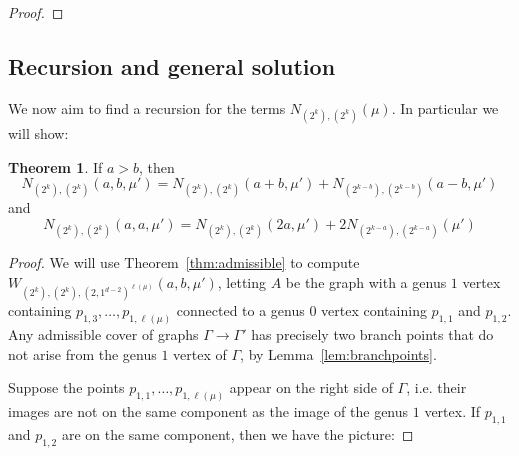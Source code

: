 \documentclass[11pt]{article}           %
\theoremstyle{definition}
\newtheorem{thm}{Theorem}[section]
\begin{document}
\begin{proof}
\end{proof}

\subsection{Recursion and general solution}

We now aim to find a recursion for the terms $N_{(2^k),(2^k)}(\mu)$. In particular we will show:

\begin{thm}
  If $a>b$, then
  \[
  N_{(2^k),(2^k)}(a,b,\mu')=N_{(2^k),(2^k)}(a+b,\mu')+N_{(2^{k-b}),(2^{k-b})}(a-b,\mu')
  \]
  and
  \[
  N_{(2^k),(2^k)}(a,a,\mu')=N_{(2^k),(2^k)}(2a,\mu')+2N_{(2^{k-a}),(2^{k-a})}(\mu')
  \]
  \end{thm}
\begin{proof}
  We will use Theorem~\ref{thm:admissible} to compute $W_{(2^k),(2^k),(2,1^{d-2})^{\ell(\mu)}}(a,b,\mu')$,
  letting $A$ be the graph with a genus $1$ vertex containing
  $p_{1,3},\dots,p_{1,\ell(\mu)}$ connected to a genus $0$ vertex containing $p_{1,1}$ and $p_{1,2}$.
  Any admissible cover of graphs $\Gamma\to\Gamma'$ has precisely two branch points that do
  not arise from the genus $1$ vertex of $\Gamma$, by Lemma~\ref{lem:branchpoints}.

  Suppose the points $p_{1,1},\dots,p_{1,\ell(\mu)}$ appear on the right side of $\Gamma$, i.e.
  their images are not on the same component as the image of the genus $1$ vertex. If
  $p_{1,1}$ and $p_{1,2}$ are on the same component, then we have the picture:

\end{proof}
\end{document}
